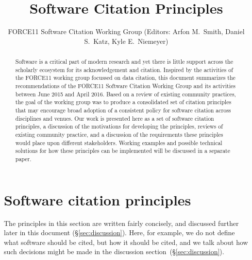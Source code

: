 \documentclass[12pt, oneside]{amsart}
\title{Software Citation Principles}
\author{FORCE11 Software Citation Working Group (Editors: Arfon M.~Smith, Daniel S.~Katz, Kyle E.~Niemeyer)}
\date{}
\newcommand{\katznote}[1]{ {\textcolor{blue} { ***DSK: #1 }}} %
\begin{document}
\begin{abstract}

\vspace{-0.2cm}
Software is a critical part of modern research and yet there is little support across the scholarly ecosystem for its acknowledgement and citation.
Inspired by the activities of the FORCE11 working group focussed on data citation, this document summarizes the recommendations of the FORCE11 Software Citation Working Group and its activities between June 2015 and April 2016.
Based on a review of existing community practices, the goal of the working group was to produce a consolidated set of citation principles that may encourage broad adoption of a consistent policy for software citation across disciplines and venues.
Our work is presented here as a set of software citation principles, a discussion of the motivations for developing the principles, reviews of existing community practice, and a discussion of the requirements these principles would place upon different stakeholders.
Working examples and possible technical solutions for how these principles can be implemented will be discussed in a separate paper.
\vspace{-1.0cm}

\end{abstract}

\maketitle

\section{Software citation principles}
\label{sec:principles}

The principles in this section are written fairly concisely, and discussed
further later in this document (\S\ref{sec:discussion}). Here, for example,
we do not define what software should be cited, but how it should be
cited, and we talk about how such decisions might be made in the
discussion section~(\S\ref{sec:discussion}).

\end{document}
